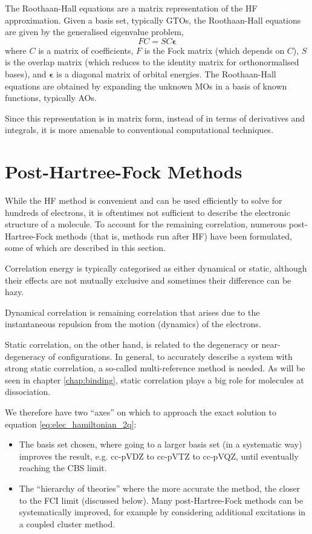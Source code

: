 The Roothaan-Hall equations are a matrix representation of the \gls{HF} approximation.\cite{roothaanNew1951,hallMolecular1997} Given a basis set, typically \glspl{GTO}, the Roothaan-Hall equations are given by the generalised eigenvalue problem,
\begin{equation}
    FC = SC\bm\epsilon
\end{equation}
where $C$ is a matrix of coefficients, $F$ is the Fock matrix (which depends on $C$), $S$ is the overlap matrix (which reduces to the identity matrix for orthonormalised bases), and $\bm\epsilon$ is a diagonal matrix of orbital energies. The Roothaan-Hall equations are obtained by expanding the unknown \glspl{MO} in a basis of known functions, typically \glspl{AO}.

Since this representation is in matrix form, instead of in terms of derivatives and integrals, it is more amenable to conventional computational techniques.

\section{Post-Hartree-Fock Methods}
\label{sec:post-hf}

While the \gls{HF} method is convenient and can be used efficiently to solve for hundreds of electrons, it is oftentimes not sufficient to describe the electronic structure of a molecule. To account for the remaining correlation, numerous post-Hartree-Fock methods (that is, methods run after \gls{HF}) have been formulated, some of which are described in this section.

Correlation energy is typically categorised as either dynamical or static, although their effects are not mutually exclusive and sometimes their difference can be hazy.

Dynamical correlation is remaining correlation that arises due to the instantaneous repulsion from the motion (dynamics) of the electrons.

Static correlation, on the other hand, is related to the degeneracy or near-degeneracy of configurations. In general, to accurately describe a system with strong static correlation, a so-called multi-reference method is needed. As will be seen in chapter \ref{chap:binding}, static correlation plays a big role for molecules at dissociation.

We therefore have two ``axes'' on which to approach the exact solution to equation \eqref{eq:elec_hamiltonian_2q}:
\begin{itemize}
    \item The basis set chosen, where going to a larger basis set (in a systematic way) improves the result, e.g. cc-pVDZ to cc-pVTZ to cc-pVQZ, until eventually reaching the \gls{CBS} limit.
    \item The ``hierarchy of theories'' where the more accurate the method, the closer to the \gls{FCI} limit (discussed below). Many post-Hartree-Fock methods can be systematically improved, for example by considering additional excitations in a coupled cluster method.
\end{itemize}

